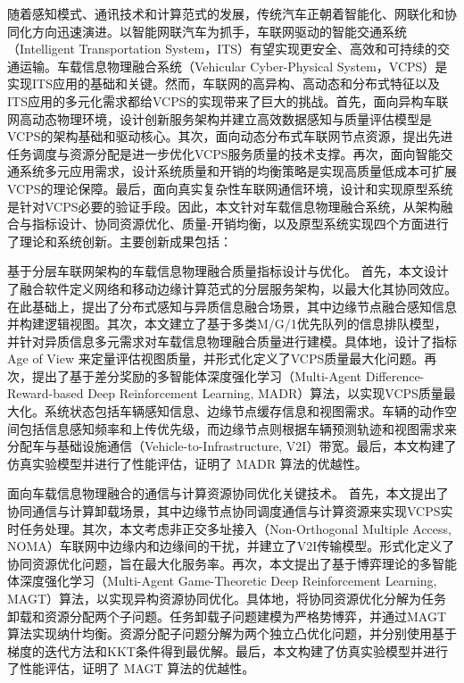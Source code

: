 \begin{cabstract}	%

随着感知模式、通讯技术和计算范式的发展，传统汽车正朝着智能化、网联化和协同化方向迅速演进。以智能网联汽车为抓手，车联网驱动的智能交通系统（Intelligent Transportation System，ITS）有望实现更安全、高效和可持续的交通运输。车载信息物理融合系统（Vehicular Cyber-Physical System，VCPS）是实现ITS应用的基础和关键。然而，车联网的高异构、高动态和分布式特征以及ITS应用的多元化需求都给VCPS的实现带来了巨大的挑战。首先，面向异构车联网高动态物理环境，设计创新服务架构并建立高效数据感知与质量评估模型是VCPS的架构基础和驱动核心。其次，面向动态分布式车联网节点资源，提出先进任务调度与资源分配是进一步优化VCPS服务质量的技术支撑。再次，面向智能交通系统多元应用需求，设计系统质量和开销的均衡策略是实现高质量低成本可扩展VCPS的理论保障。最后，面向真实复杂性车联网通信环境，设计和实现原型系统是针对VCPS必要的验证手段。因此，本文针对车载信息物理融合系统，从架构融合与指标设计、协同资源优化、质量-开销均衡，以及原型系统实现四个方面进行了理论和系统创新。主要创新成果包括：

 基于分层车联网架构的车载信息物理融合质量指标设计与优化。
首先，本文设计了融合软件定义网络和移动边缘计算范式的分层服务架构，以最大化其协同效应。 在此基础上，提出了分布式感知与异质信息融合场景，其中边缘节点融合感知信息并构建逻辑视图。其次，本文建立了基于多类M/G/1优先队列的信息排队模型，并针对异质信息多元需求对车载信息物理融合质量进行建模。具体地，设计了指标 Age of View 来定量评估视图质量，并形式化定义了VCPS质量最大化问题。再次，提出了基于差分奖励的多智能体深度强化学习（Multi-Agent Difference-Reward-based Deep Reinforcement Learning, MADR）算法，以实现VCPS质量最大化。系统状态包括车辆感知信息、边缘节点缓存信息和视图需求。车辆的动作空间包括信息感知频率和上传优先级，而边缘节点则根据车辆预测轨迹和视图需求来分配车与基础设施通信（Vehicle-to-Infrastructure, V2I）带宽。最后，本文构建了仿真实验模型并进行了性能评估，证明了 MADR 算法的优越性。

 面向车载信息物理融合的通信与计算资源协同优化关键技术。
首先，本文提出了协同通信与计算卸载场景，其中边缘节点协同调度通信与计算资源来实现VCPS实时任务处理。其次，本文考虑非正交多址接入（Non-Orthogonal Multiple Access, NOMA）车联网中边缘内和边缘间的干扰，并建立了V2I传输模型。形式化定义了协同资源优化问题，旨在最大化服务率。再次，本文提出了基于博弈理论的多智能体深度强化学习（Multi-Agent Game-Theoretic Deep Reinforcement Learning, MAGT）算法，以实现异构资源协同优化。具体地，将协同资源优化分解为任务卸载和资源分配两个子问题。任务卸载子问题建模为严格势博弈，并通过MAGT算法实现纳什均衡。资源分配子问题分解为两个独立凸优化问题，并分别使用基于梯度的迭代方法和KKT条件得到最优解。最后，本文构建了仿真实验模型并进行了性能评估，证明了 MAGT 算法的优越性。


\end{cabstract}
